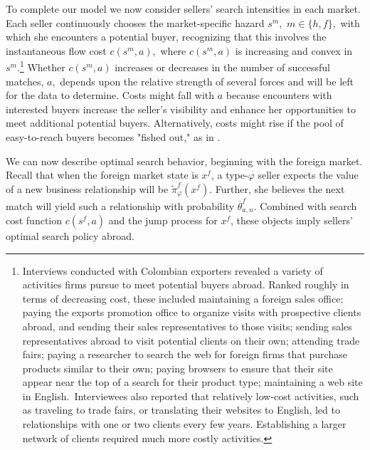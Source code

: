 To complete our model we now consider sellers' search intensities in each
market. Each seller continuously chooses the market-specific hazard $s^{m},$ 
$m\in \{h,f\},$ with which she encounters a potential buyer, recognizing
that this involves the instantaneous flow cost $c(s^{m},a),$ where $%
c(s^{m},a)$ is increasing and convex in $s^{m}.$\footnote{%
Interviews conducted with Colombian exporters revealed a variety of
activities firms pursue to meet potential buyers abroad\citep{dominguez2010search}. Ranked roughly in terms of decreasing cost, these included
maintaining a foreign sales office; paying the exports promotion office to
organize visits with prospective clients abroad, and sending their sales
representatives to those visits; sending sales representatives abroad to
visit potential clients on their own; attending trade fairs; paying a
researcher to search the web for foreign firms that purchase products
similar to their own; paying browsers to ensure that their site appear near
the top of a search for their product type; maintaining a web site in
English.\medskip\ Interviewees also reported that relatively low-cost
activities, such as traveling to trade fairs, or translating their websites
to English, led to relationships with one or two clients every few years.
Establishing a larger network of clients required much more costly
activities.} Whether $c(s^{m},a)$ increases or decreases in the number of
successful matches, $a,$ depends upon the relative strength of several
forces and will be left for the data to determine. Costs might fall with $a$
because encounters with interested buyers increase the seller's visibility
and enhance her opportunities to meet additional potential buyers.
Alternatively, costs might rise if the pool of easy-to-reach buyers becomes
"fished out," as in \citet{arkolakis2010market}.

We can now describe optimal search behavior, beginning with the foreign
market. Recall that when the foreign market state is $x^{f}$, a type-$%
\varphi $ seller expects the value of a new business relationship will be $%
\widetilde{\pi }_{\varphi }^{f}(x^{f}).$ Further, she believes the next
match will yield such a relationship with probability $\overline{\theta }%
_{a,n}^{f}$. Combined with search cost function $c(s^{f},a)$ and the jump
process for $x^{f}$, these objects imply sellers' optimal search policy
abroad.

